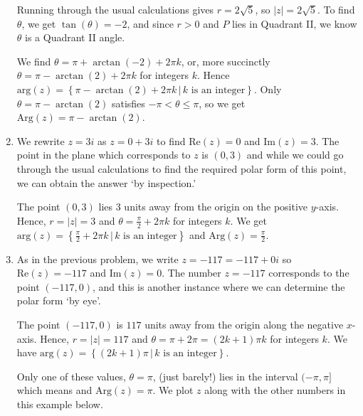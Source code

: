 \documentclass{ximera}
\begin{document}
\begin{example}
\begin{enumerate}
\smallskip

 Running through the usual calculations gives $r = 2\sqrt{5}$, so $|z| = 2\sqrt{5}$.  To find $\theta$, we get $\tan(\theta) = -2$, and since $r > 0$ and $P$ lies in Quadrant II, we know $\theta$  is a Quadrant II angle.  
 
 \smallskip
 
We find $\theta = \pi + \arctan(-2) + 2\pi k$, or, more succinctly  $\theta = \pi - \arctan(2) + 2\pi k$ for integers $k$.  Hence $\text{arg}(z) = \left\{\pi - \arctan(2) + 2\pi k \, | \, \text{$k$ is an integer}\right\}$.  Only  $\theta = \pi - \arctan(2)$ satisfies $-\pi < \theta \leq \pi$,  so we get $\text{Arg}(z) = \pi - \arctan(2)$. 

\item    We rewrite $z = 3i$ as $z = 0+3i$ to find $\text{Re}(z) = 0$ and $\text{Im}(z) = 3$.  The point in the plane which corresponds to $z$ is $(0,3)$ and while we could go through the usual calculations to find the required polar form of this point, we can obtain the answer `by inspection.'

\smallskip

  The point  $(0,3)$ lies $3$ units away from the origin on the positive $y$-axis.  Hence, $r=|z|=3$ and $\theta = \frac{\pi}{2} + 2\pi k$ for integers $k$. We get $\text{arg}(z) = \left\{ \frac{\pi}{2} + 2\pi k \, | \, \text{$k$ is an integer} \right\}$ and $\text{Arg}(z) = \frac{\pi}{2}$. 

\item As in the previous problem, we write $z = -117 = -117 + 0i$ so $\text{Re}(z) = -117$ and $\text{Im}(z) = 0$. The number $z = -117$ corresponds to the point $(-117,0)$, and this is another instance where  we can determine the polar form `by eye'.  

\smallskip

The point $(-117,0)$ is $117$ units away from the origin along the negative $x$-axis.  Hence, $r=|z|=117$ and $\theta = \pi + 2\pi  = (2k+1)\pi k$ for integers $k$. We have  $\text{arg}(z) = \left\{ (2k+1)\pi \, | \, k \text{ is an  integer} \right\}$.  

\smallskip

Only one of these values, $\theta = \pi$, (just barely!) lies in the interval $(-\pi, \pi]$ which means and $\text{Arg}(z) =\pi$. We plot $z$ along with the other numbers in this example below.


\begin{center}


\end{center}
\end{enumerate}
\end{example}
\end{document}
